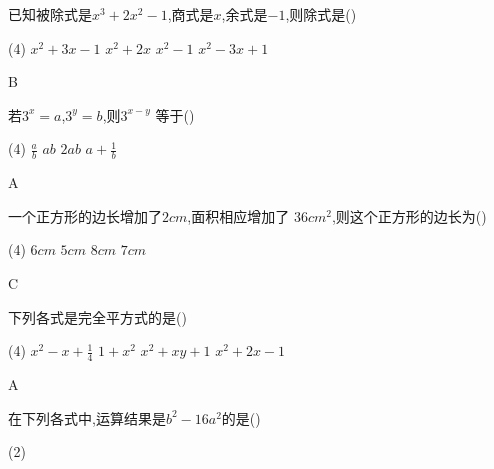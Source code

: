 \documentclass[cn,blue,12pt]{elegantbook}
\begin{document}
\begin{shiti}
\begin{shiti}[resume]
        \item 已知被除式是\( x^3 +2x^2-1\),商式是\( x\),余式是\(-1\),则除式是(\qquad)\\
            \begin{tasks}(4)
                \task \( x^2 +3x-1  \)
                \task \( x^2 +2x  \)
                \task \( x^2 -1  \)
                \task \( x^2 -3x+1\)
            \end{tasks}
\begin{solution}
                B\\
\end{solution}
        \item 若\( 3^x =a\),\(3^y =b\),则\( 3^{x-y}\) 等于(\qquad)\\
            \begin{tasks}(4)
                \task \(\frac{a}{b}\)
                \task \(ab\)
                \task \(2ab\)
                \task \(a+\frac{1}{b}\)
            \end{tasks}
\begin{solution}
                A\\
\end{solution}
        \item 一个正方形的边长增加了\( 2cm \),面积相应增加了 \(36 cm^2\),则这个正方形的边长为(\qquad)\\
            \begin{tasks}(4)
                \task \( 6cm  \)
                \task \( 5cm  \)
                \task \( 8cm  \)
                \task \( 7cm\)
            \end{tasks}
\begin{solution}
                C\\
\end{solution}
        \item 下列各式是完全平方式的是(\qquad)\\
            \begin{tasks}(4)
                \task \(x^2-x+\frac{1}{4}\)
                \task \(1+x^2\)
                \task \(x^2+xy+1\)
                \task \(x^2+2x-1\)
            \end{tasks}
\begin{solution}
                A\\
\end{solution}
        \item 在下列各式中,运算结果是\(b^2-16a^2\)的是(\qquad)\\
            \begin{tasks}(2)

\end{tasks}
\end{shiti}
\end{shiti}
\end{document}
